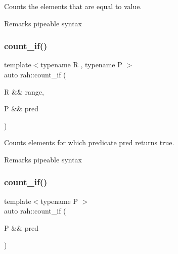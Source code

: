 Counts the elements that are equal to value. 

\begin{DoxyRemark}{Remarks}
pipeable syntax
\end{DoxyRemark}

\begin{DoxyCodeInclude}{0}
\end{DoxyCodeInclude}
\mbox{\label{namespacerah_a8e6a379c05d482a52137f5647783fe27}} 
\subsubsection{\texorpdfstring{count\_if()}{count\_if()}\hspace{0.1cm}{\footnotesize\ttfamily [1/2]}}
{\footnotesize\ttfamily template$<$typename R , typename P $>$ \\
auto rah\+::count\+\_\+if (\begin{DoxyParamCaption}\item[{R \&\&}]{range,  }\item[{P \&\&}]{pred }\end{DoxyParamCaption})}



Counts elements for which predicate pred returns true. 

\begin{DoxyRemark}{Remarks}
pipeable syntax
\end{DoxyRemark}

\begin{DoxyCodeInclude}{0}
\end{DoxyCodeInclude}
\mbox{\label{namespacerah_a9e22b56a1f28a353659fed572f33f5a9}} 
\subsubsection{\texorpdfstring{count\_if()}{count\_if()}\hspace{0.1cm}{\footnotesize\ttfamily [2/2]}}
{\footnotesize\ttfamily template$<$typename P $>$ \\
auto rah\+::count\+\_\+if (\begin{DoxyParamCaption}\item[{P \&\&}]{pred }\end{DoxyParamCaption})}



